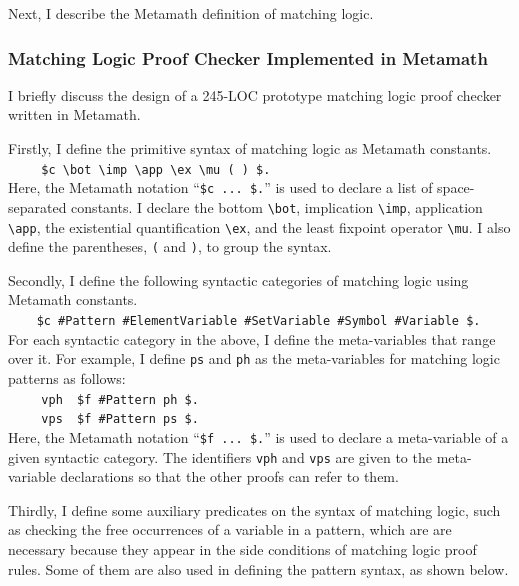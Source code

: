 \documentclass[11pt]{article}
\begin{document}
Next, I describe the Metamath definition of matching logic.



\subsubsection{Matching Logic Proof Checker Implemented in Metamath}
\label{sec:proposed-mm}

I briefly discuss the design of a 245-LOC prototype matching logic proof checker
\cite{ml-checker} written in Metamath. 

Firstly, I define the primitive syntax of matching logic as Metamath 
constants. \\
\verb|    | \verb|$c \bot \imp \app \ex \mu ( ) $.| \\
Here, the Metamath notation ``\verb|$c ... $.|'' is used to declare a list of 
space-separated constants. 
I declare the bottom \verb|\bot|, 
implication \verb|\imp|,
application \verb|\app|,
the existential quantification \verb|\ex|,
and the least fixpoint operator \verb|\mu|. 
I also define the parentheses, \verb|(| and \verb|)|,
to group the syntax. 

Secondly, I define the following syntactic categories of matching logic using 
Metamath constants. \\
\verb|    |
\verb|$c #Pattern #ElementVariable #SetVariable #Symbol #Variable $.| \\
For each syntactic category in the above, I define the meta-variables that range over it.
For example, I define \verb|ps| and \verb|ph| as the meta-variables for 
matching logic patterns as follows: \\
\verb|    |
\verb|vph  $f #Pattern ph $.| \\
\verb|    |
\verb|vps  $f #Pattern ps $.| \\
Here, the Metamath notation ``\verb|$f ... $.|'' is used to declare a 
meta-variable of a given syntactic category. 
The identifiers \verb|vph| and \verb|vps| are given to the meta-variable 
declarations so that the other proofs can refer to them. 

Thirdly, I define some auxiliary predicates on the syntax of matching logic,
such as checking the free occurrences of a variable in a pattern,
which are are necessary because they appear in the side conditions of matching logic proof rules. 
Some of them are also used in defining the pattern syntax, as shown below. 
\end{document}
